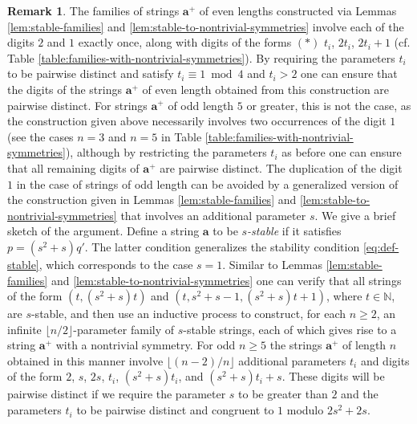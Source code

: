 \documentclass[10pt]{article}
\theoremstyle{definition}
\newtheorem{remark}[lemma]{Remark}
\numberwithin{equation}{section}
\numberwithin{lemma}{section}
\newcommand{\NN}{\mathbb{N}}
\newcommand{\bfa}{\mathbf{a}}
\newcommand{\bfap}{\bfa^+}
\begin{document}
\begin{remark}
\label{rem:generalized-stable-families}
The families of strings $\bfap$ of even lengths
constructed via Lemmas \ref{lem:stable-families} and
\ref{lem:stable-to-nontrivial-symmetries} 
involve each of the digits $2$
and $1$ exactly once, along with digits of the forms $(*)$ $t_i$,
$2t_i$, $2t_i+1$ 
(cf.  Table \ref{table:families-with-nontrivial-symmetries}). 
By requiring the parameters $t_i$
to be pairwise distinct and satisfy $t_i\equiv 1\bmod 4$ and $t_i>2$
one can ensure that the digits of the strings $\bfap$ of even length
obtained from this construction are pairwise distinct.  
%
For strings $\bfap$ of odd length $5$ or greater, 
this is not the case, as the construction given above necessarily
involves two
occurrences of the digit $1$ (see the cases $n=3$ and $n=5$ in Table
\ref{table:families-with-nontrivial-symmetries}), although by
restricting the parameters $t_i$ as before one can ensure that all
remaining digits of $\bfap$ are  pairwise distinct. 
%
The duplication 
of the digit $1$ in the case of strings of odd length can be avoided 
by a generalized version of the construction given in Lemmas
\ref{lem:stable-families} and \ref{lem:stable-to-nontrivial-symmetries}
that involves an additional parameter $s$.  We give a brief sketch of the
argument.
Define a string $\bfa$ to be \emph{$s$-stable} if it satisfies
$p=(s^2+s)q'$. The latter condition generalizes the stability condition
\eqref{eq:def-stable}, which corresponds to the case $s=1$. 
Similar to 
Lemmas \ref{lem:stable-families} and \ref{lem:stable-to-nontrivial-symmetries}
one can verify that all strings of the form $(t,(s^2+s)t)$ 
and $(t,s^2+s-1, (s^2+s)t+1)$, where $t\in\NN$, 
are $s$-stable, and then use an inductive process 
to construct, for each $n\ge2$, an infinite $\lfloor
n/2\rfloor$-parameter family of $s$-stable strings, each of which gives
rise to a string $\bfap$  with a nontrivial symmetry.
For odd $n\ge5$ the strings $\bfap$  of length $n$ 
obtained in this manner involve $\lfloor (n-2)/n\rfloor$ additional parameters
$t_i$ and digits of the form $2$, $s$, $2s$, 
$t_i$, $(s^2+s)t_i$, and $(s^2+s)t_i+s$. 
These digits will be pairwise distinct if we  
require the parameter $s$ to be greater than $2$ and the parameters $t_i$ to be
pairwise distinct and congruent to $1$ modulo $2s^2+2s$.
\end{remark}



\end{document}
